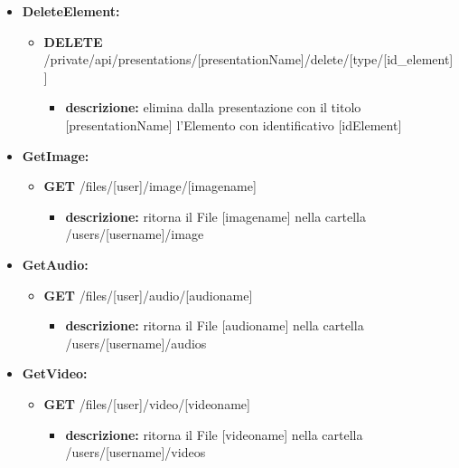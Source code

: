 {{\begin{itemize}
		\item \textbf{DeleteElement:}
			\begin{itemize}
			\item   \textbf{DELETE} /private/api/presentations/[presentationName]/delete/[type/[id\_element]]
				\begin{itemize} 
				\item \textbf{descrizione:} elimina dalla presentazione con il titolo [presentationName] l'Elemento con identificativo [idElement]						
				\end{itemize}
			\end{itemize}
			
			
		\item \textbf{GetImage:}
			\begin{itemize}
			\item    \textbf{GET} /files/[user]/image/[imagename]
				\begin{itemize} 
				\item \textbf{descrizione:} ritorna il File nella cartella /users/[username]/image				\end{itemize}
			\end{itemize}
			
		\item \textbf{GetAudio:}
			\begin{itemize}
			\item    \textbf{GET} /files/[user]/audio/[audioname]
				\begin{itemize} 
				\item \textbf{descrizione:} ritorna il File nella cartella /users/[username]/audios				\end{itemize}		
			\end{itemize}
			
		\item \textbf{GetVideo:}
			\begin{itemize}
			\item    \textbf{GET} /files/[user]/video/[videoname]
				\begin{itemize} 
				\item \textbf{descrizione:} ritorna il File nella cartella /users/[username]/videos					
				\end{itemize}
			\end{itemize}
	
			
			

\end{itemize}}}
